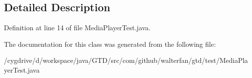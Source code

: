 \subsection{Detailed Description}


Definition at line 14 of file Media\-Player\-Test.\-java.



The documentation for this class was generated from the following file\-:\begin{DoxyCompactItemize}
\item 
/cygdrive/d/workspace/java/\-G\-T\-D/src/com/github/walterfan/gtd/test/Media\-Player\-Test.\-java\end{DoxyCompactItemize}
